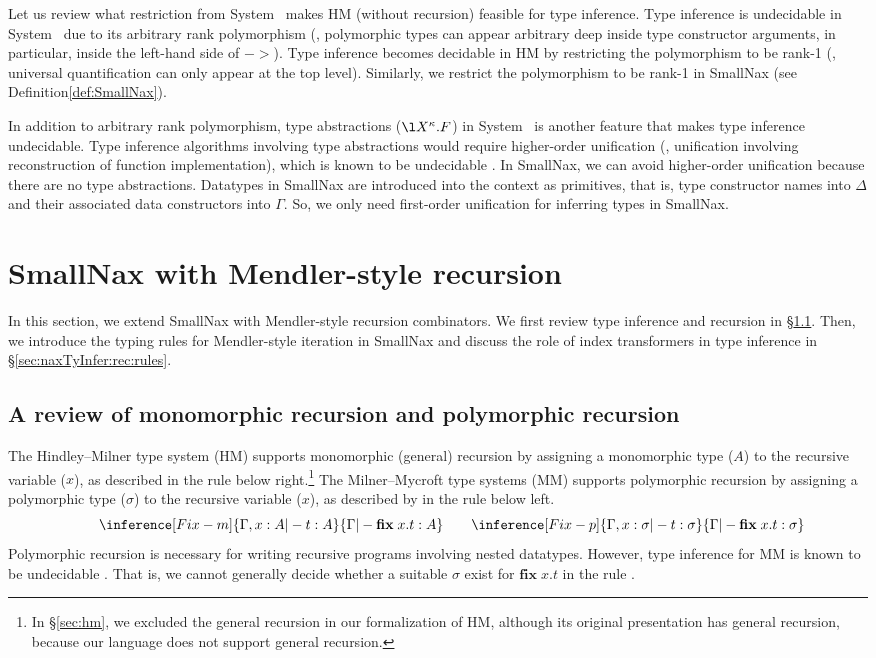 Let us review what restriction from System \F\ makes HM (without recursion)
feasible for type inference. Type inference is undecidable in System \F\ 
due to its arbitrary rank polymorphism (\ie, polymorphic types can appear
arbitrary deep inside type constructor arguments, in particular, inside
the left-hand side of $->$). Type inference becomes decidable in HM
by restricting the polymorphism to be rank-1 (\ie, universal quantification
can only appear at the top level). Similarly, we restrict the polymorphism
to be rank-1 in SmallNax (see Definition\;\ref{def:SmallNax}).

In addition to arbitrary rank polymorphism, type abstractions ($\l X^\kappa.F$)
in System \Fw\ is another feature that makes type inference undecidable.
Type inference algorithms involving type abstractions would require
higher-order unification (\ie, unification involving reconstruction of
function implementation), which is known to be undecidable \cite{Gol81}.
In SmallNax, we can avoid higher-order unification because there are no
type abstractions. Datatypes in SmallNax are introduced into the context
as primitives, that is, type constructor names into $\Delta$ and
their associated data constructors into $\Gamma$. So, we only need
first-order unification for inferring types in SmallNax.

\section{SmallNax with Mendler-style recursion}
\label{sec:naxTyInfer:rec}
In this section, we extend SmallNax with Mendler-style recursion combinators.
We first review type inference and recursion in \S\ref{sec:naxTyInfer:rec:MM}.
Then, we introduce the typing rules for Mendler-style iteration in SmallNax
and discuss the role of index transformers in type inference
in \S\ref{sec:naxTyInfer:rec:rules}.

\subsection{A review of monomorphic recursion and polymorphic recursion}
\label{sec:naxTyInfer:rec:MM}
The Hindley--Milner type system (HM) \cite{DamMil82} supports
monomorphic (general) recursion by assigning a monomorphic type ($A$)
to the recursive variable ($x$), as described in the rule 
below right.\footnote{
	In \S\ref{sec:hm}, we excluded the general recursion in
	our formalization of HM, although its original presentation
	has general recursion, because our language does not support
	general recursion.}
The Milner--Mycroft type systems (MM) \cite{Myc84} supports
polymorphic recursion by assigning a polymorphic type ($\sigma$)
to the recursive variable ($x$), as described by in the rule 
below left.
\[
\qquad
\inference[\sc Fix-m]{\Gamma,x:A |- t : A}{
	\Gamma |- \textbf{fix}\;x.t : A}
\qquad
\inference[\sc Fix-p]{\Gamma,x:\sigma |- t : \sigma}{
	\Gamma |- \textbf{fix}\;x.t : \sigma}
\]
Polymorphic recursion is necessary for writing recursive programs
involving nested datatypes. However, type inference for MM is
known to be undecidable \cite{Hen93}. That is, we cannot generally
decide whether a suitable $\sigma$ exist for $\textbf{fix}\;x.t$
in the rule \rulename{Fix-p}.

